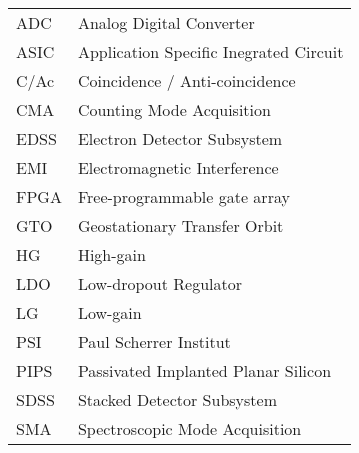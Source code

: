 \begin{center}
\begin{tabular}{p{2cm}p{8cm}}
	ADC & Analog Digital Converter \\
	ASIC & Application Specific Inegrated Circuit \\
    C/Ac & Coincidence / Anti-coincidence \\
    CMA & Counting Mode Acquisition \\
	EDSS & Electron Detector Subsystem \\
	EMI & Electromagnetic Interference \\
    FPGA & Free-programmable gate array \\
	GTO & Geostationary Transfer Orbit \\
    HG & High-gain               \\
	LDO & Low-dropout Regulator \\
    LG & Low-gain            \\
	PSI & Paul Scherrer Institut \\
	PIPS & Passivated Implanted Planar Silicon \\
	SDSS & Stacked Detector Subsystem \\
    SMA & Spectroscopic Mode Acquisition \\
    
\end{tabular}
\end{center}

